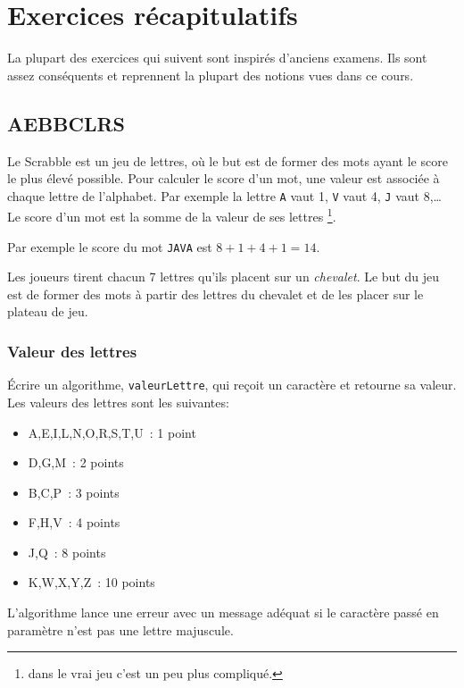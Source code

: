 \chapter{Exercices récapitulatifs}

	La plupart des exercices qui suivent sont inspirés
	d’anciens examens.
	Ils sont assez conséquents et reprennent
	la plupart des notions vues dans ce cours.

	\section{AEBBCLRS}

		Le Scrabble est un jeu de lettres, 
		où le but est de former des mots ayant le score le plus élevé possible.
		Pour calculer le score d’un mot, 
		une valeur est associée à chaque lettre de l’alphabet. 
		Par exemple la lettre \texttt{A} vaut 1, \texttt{V} vaut 4, 
		\texttt{J} vaut 8,\dots{}
		Le score d’un mot est la somme de la valeur de ses lettres%
		\footnote{dans le vrai jeu c’est un peu plus compliqué.}.

		Par exemple le score du mot \texttt{JAVA} est $8+1+4+1 = 14$.

		Les joueurs tirent chacun 7 lettres qu’ils placent sur un \emph{chevalet}.
		Le but du jeu est de former des mots à partir des lettres du chevalet et de les placer sur le plateau de jeu.
	
		\subsection*{Valeur des lettres}
	
			\'Ecrire un algorithme, \texttt{valeurLettre}, 
			qui reçoit un caractère et retourne sa valeur. 
			Les valeurs des lettres sont les suivantes: 
			\begin{itemize}
			\item A,E,I,L,N,O,R,S,T,U~: 1 point
			\item D,G,M~: 2 points
			\item B,C,P~: 3 points
			\item F,H,V~: 4 points
			\item J,Q~: 8 points
			\item K,W,X,Y,Z~: 10 points
			\end{itemize}	

			L’algorithme lance une erreur avec un message adéquat 
			si le caractère passé en paramètre n’est pas une lettre majuscule.  
	
